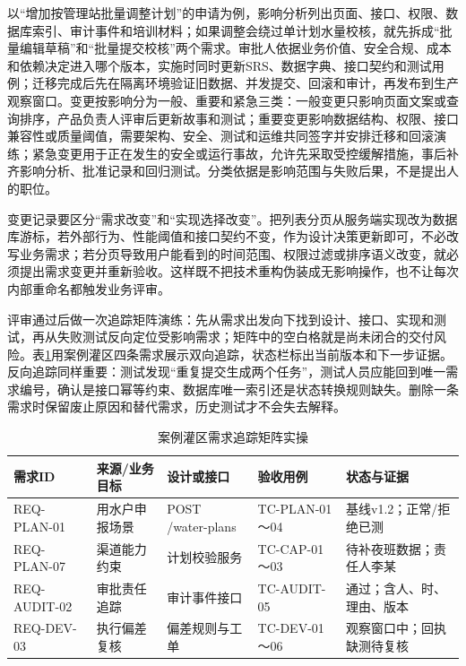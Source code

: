 以“增加按管理站批量调整计划”的申请为例，影响分析列出页面、接口、权限、数据库索引、审计事件和培训材料；如果调整会绕过单计划水量校核，就先拆成“批量编辑草稿”和“批量提交校核”两个需求。审批人依据业务价值、安全合规、成本和依赖决定进入哪个版本，实施时同时更新SRS、数据字典、接口契约和测试用例；迁移完成后先在隔离环境验证旧数据、并发提交、回滚和审计，再发布到生产观察窗口。变更按影响分为一般、重要和紧急三类：一般变更只影响页面文案或查询排序，产品负责人评审后更新故事和测试；重要变更影响数据结构、权限、接口兼容性或质量阈值，需要架构、安全、测试和运维共同签字并安排迁移和回滚演练；紧急变更用于正在发生的安全或运行事故，允许先采取受控缓解措施，事后补齐影响分析、批准记录和回归测试。分类依据是影响范围与失败后果，不是提出人的职位。

变更记录要区分“需求改变”和“实现选择改变”。把列表分页从服务端实现改为数据库游标，若外部行为、性能阈值和接口契约不变，作为设计决策更新即可，不必改写业务需求；若分页导致用户能看到的时间范围、权限过滤或排序语义改变，就必须提出需求变更并重新验收。这样既不把技术重构伪装成无影响操作，也不让每次内部重命名都触发业务评审。

评审通过后做一次追踪矩阵演练：先从需求出发向下找到设计、接口、实现和测试，再从失败测试反向定位受影响需求；矩阵中的空白格就是尚未闭合的交付风险。表\ref{tab:requirements-traceability}用案例灌区四条需求展示双向追踪，状态栏标出当前版本和下一步证据。反向追踪同样重要：测试发现“重复提交生成两个任务”，测试人员应能回到唯一需求编号，确认是接口幂等约束、数据库唯一索引还是状态转换规则缺失。删除一条需求时保留废止原因和替代需求，历史测试才不会失去解释。

\begin{table}[htbp]
\centering
\caption{案例灌区需求追踪矩阵实操}
\label{tab:requirements-traceability}
\begin{tabular}{p{1.8cm}p{3.1cm}p{2.8cm}p{2.5cm}p{2.2cm}}
\toprule
需求ID & 来源/业务目标 & 设计或接口 & 验收用例 & 状态与证据 \\
\midrule
REQ-PLAN-01 & 用水户申报场景 & POST /water-plans & TC-PLAN-01～04 & 基线v1.2；正常/拒绝已测 \\
REQ-PLAN-07 & 渠道能力约束 & 计划校验服务 & TC-CAP-01～03 & 待补夜班数据；责任人李某 \\
REQ-AUDIT-02 & 审批责任追踪 & 审计事件接口 & TC-AUDIT-05 & 通过；含人、时、理由、版本 \\
REQ-DEV-03 & 执行偏差复核 & 偏差规则与工单 & TC-DEV-01～06 & 观察窗口中；回执缺测待复核 \\
\bottomrule
\end{tabular}
\end{table}

